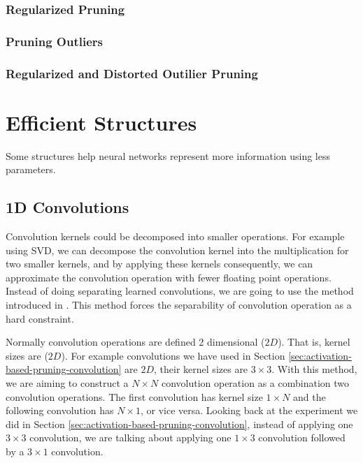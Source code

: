 \subsubsection{Regularized Pruning}

\subsubsection{Pruning Outliers}

\subsubsection{Regularized and Distorted Outilier Pruning}


\section{Efficient Structures}
Some structures help neural networks represent more information using less parameters.
\subsection{1D Convolutions}
Convolution kernels could be decomposed into smaller operations. For example using SVD, we can decompose the convolution kernel into the multiplication for two smaller kernels, and by applying these kernels consequently, we can approximate the convolution operation with fewer floating point operations. Instead of doing separating learned convolutions, we are going to use the method introduced in \cite{alvarez2016decomposeme}. This method forces the separability of convolution operation as a hard constraint. 

Normally convolution operations are defined 2 dimensional ($2D$). That is, kernel sizes are ($2D$). For example convolutions we have used in Section \ref{sec:activation-based-pruning-convolution} are $2D$, their kernel sizes are $3 \times 3$. With this method, we are aiming to construct a $N \times N$ convolution operation as a combination two convolution operations. The first convolution has kernel size $1 \times N$ and the following convolution has $N \times 1$, or vice versa. Looking back at the experiment we did in  Section \ref{sec:activation-based-pruning-convolution}, instead of applying one $3 \times 3$ convolution, we are talking about applying one $1 \times 3$ convolution followed by a $3 \times 1$ convolution. 

